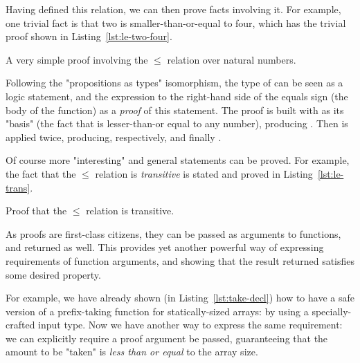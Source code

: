             Having defined this relation, we can then prove facts involving it.
            For example, one trivial fact is that two is smaller-than-or-equal to four,
            which has the trivial proof shown in Listing~\ref{lst:le-two-four}.

            \begin{listing}[h]
                \caption{A very simple proof involving the $\le$ relation over natural numbers.
                    \label{lst:le-two-four}}
            \end{listing}

            Following the "propositions as types" isomorphism, the type of 
            can be seen as a logic statement, and the expression to the right-hand side of the equals sign
            (the body of the function) as a \emph{proof} of this statement.
            The proof is built with  as its "basis" (the fact that  is
            lesser-than-or equal to any number), producing   .
            Then  is applied twice, producing, respectively,   
            and finally   .

            Of course more "interesting" and general statements can be proved.
            For example, the fact that the $\le$ relation is \emph{transitive} is
            stated and proved in Listing~\ref{lst:le-trans}.

            \begin{listing}[h]
                \caption{Proof that the $\le$ relation is transitive. \label{lst:le-trans}}
            \end{listing}

            As proofs are first-class citizens, they can be passed as arguments to functions,
            and returned as well.
            This provides yet another powerful way of expressing requirements of function arguments,
            and showing that the result returned satisfies some desired property.

            For example, we have already shown (in Listing~\ref{lst:take-decl}) how to have a safe
            version of a prefix-taking function for statically-sized arrays:
            by using a specially-crafted input type.
            Now we have another way to express the same requirement:
            we can explicitly require a proof argument be passed,
            guaranteeing that the amount to be "taken" is \emph{less than or equal} to the array size.

